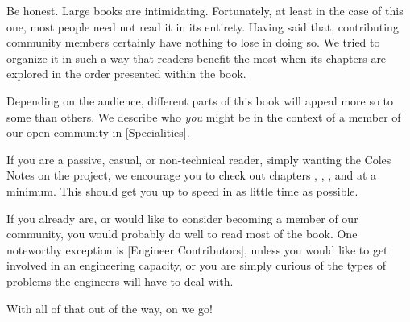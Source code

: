 

Be honest. Large books are intimidating. Fortunately, at least in the case of this one, most people need not read it in its entirety. Having said that, contributing community members certainly have nothing to lose in doing so. We tried to organize it in such a way that readers benefit the most when its chapters are explored in the order presented within the book.

Depending on the audience, different parts of this book will appeal more so to some than others. We describe who {\it you} might be in the context of a member of our open community in [Specialities].

If you are a passive, casual, or non-technical reader, simply wanting the Coles Notes on the project, we encourage you to check out chapters \in[Leitmotifs], , , and \in[Timeline] at a minimum. This should get you up to speed in as little time as possible.

If you already are, or would like to consider becoming a member of our community, you would probably do well to read most of the book. One noteworthy exception is [Engineer Contributors], unless you would like to get involved in an engineering capacity, or you are simply curious of the types of problems the engineers will have to deal with.

With all of that out of the way, on we go!

\StopChapter

